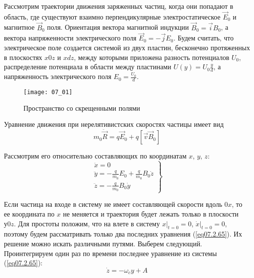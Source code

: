 
Рассмотрим траектории движения заряженных частиц, когда они попадают в 
область, где существуют взаимно перпендикулярные электростатическое 
\( \vec{E}_0 \) и магнитное \( \vec{B}_0 \) поля. Ориентация вектора магнитной 
индукции \( \vec{B}_0 = \vec{i}B_0 \), а вектора напряженности электрического 
поля \( \vec{E}_0 = -\vec{j}E_0 \). Будем считать, что электрическое поле
создается системой из двух пластин, бесконечно протяженных в плоскостях
\( x0z \) и \( xdz \), между которыми приложена разность потенциалов \( U_0 \),
распределение потенциала в области между пластинами 
\( U(y) = U_0 \frac{y}{d} \), а напряженность электрического поля 
\( E_0 = \frac{U_0}{d} \).

\begin{figure}[h!]
	\center
	\texttt{[image: 07\_01]}
	\caption{Пространство со скрещенными полями}
	\label{img07.1}
\end{figure}

Уравнение движения при нерелятивистских скоростях частицы имеет вид
\[
	m_0 \ddot{\vec{R}} = q\vec{E}_0 + q\left[ \vec{v}\vec{B}_0 \right]
\]

Рассмотрим его относительно составляющих по координатам 
\( x \), \( y \), \( z \):
\begin{equation}
	\left. \begin{array}{c}
		\ddot{x} = 0 \\
		\ddot{y} = -\frac{q}{m_0}E_0 + \frac{q}{m_0}B_0 \dot{z} \\
		\ddot{z} = -\frac{q}{m_0}B_0 \dot{y}
	\end{array} \right\}
	\label{eq07.2.65}
\end{equation}

Если частица на входе в систему не имеет составляющей скорости вдоль \( 0x \), 
то ее координата по \( x \) не меняется и траектория будет лежать только в 
плоскости \( у0z \). Для простоты положим, что на влете в систему 
\( x\Big|_{t=0} = 0\), \( \dot{x}\Big|_{t=0} = 0 \), поэтому будем 
рассматривать только два последних уравнения (\ref{eq07.2.65}). Их решение 
можно искать различными путями. Выберем следующий. Проинтегрируем один раз 
по времени последнее уравнение из системы (\ref{eq07.2.65}):
\begin{equation}
	\dot{z} = -\omega_c y + A
	\label{eq07.2.66}
\end{equation}

